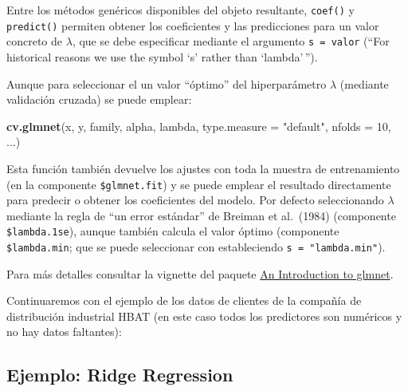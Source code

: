 \documentclass[
]{book}
\newenvironment{Shaded}{\begin{snugshade}}{\end{snugshade}}
\newcommand{\DataTypeTok}[1]{\textcolor[rgb]{0.13,0.29,0.53}{#1}}
\newcommand{\DecValTok}[1]{\textcolor[rgb]{0.00,0.00,0.81}{#1}}
\newcommand{\KeywordTok}[1]{\textcolor[rgb]{0.13,0.29,0.53}{\textbf{#1}}}
\newcommand{\NormalTok}[1]{#1}
\newcommand{\OperatorTok}[1]{\textcolor[rgb]{0.81,0.36,0.00}{\textbf{#1}}}
\newcommand{\StringTok}[1]{\textcolor[rgb]{0.31,0.60,0.02}{#1}}
\theoremstyle{break}
\theoremstyle{definition}
\theoremstyle{definition}
\theoremstyle{definition}
\theoremstyle{remark}
\begin{document}
Entre los métodos genéricos disponibles del objeto resultante, \texttt{coef()} y \texttt{predict()} permiten obtener los coeficientes y las predicciones para un valor concreto de \(\lambda\), que se debe especificar mediante el argumento \texttt{s\ =\ valor} (``For historical reasons we use the symbol `s' rather than `lambda'\,'').

Aunque para seleccionar el un valor ``óptimo'' del hiperparámetro \(\lambda\) (mediante validación cruzada) se puede emplear:

\begin{Shaded}
\begin{Highlighting}[]
\KeywordTok{cv.glmnet}\NormalTok{(x, y, family, alpha, lambda, }\DataTypeTok{type.measure =} \StringTok{"default"}\NormalTok{, }\DataTypeTok{nfolds =} \DecValTok{10}\NormalTok{, ...)}
\end{Highlighting}
\end{Shaded}

Esta función también devuelve los ajustes con toda la muestra de entrenamiento (en la componente \texttt{\$glmnet.fit}) y se puede emplear el resultado directamente para predecir o obtener los coeficientes del modelo.
Por defecto seleccionando \(\lambda\) mediante la regla de ``un error estándar'' de Breiman et al.~(1984) (componente \texttt{\$lambda.1se}), aunque también calcula el valor óptimo (componente \texttt{\$lambda.min}; que se puede seleccionar con estableciendo \texttt{s\ =\ "lambda.min"}).

Para más detalles consultar la vignette del paquete \href{https://glmnet.stanford.edu/articles/glmnet.html}{An Introduction to glmnet}.

Continuaremos con el ejemplo de los datos de clientes de la compañía de distribución industrial HBAT (en este caso todos los predictores son numéricos y no hay datos faltantes):

\begin{Shaded}
\end{Shaded}

\hypertarget{ejemplo-ridge-regression}{%
\subsection{Ejemplo: Ridge Regression}\label{ejemplo-ridge-regression}}
\end{document}
